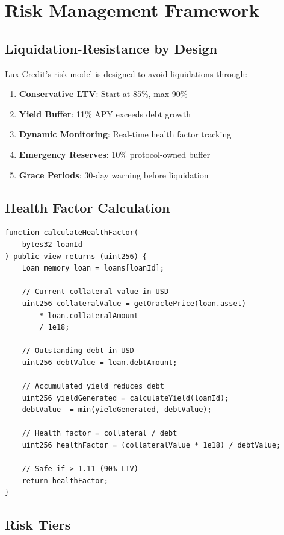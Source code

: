 \section{Risk Management Framework}


\subsection{Liquidation-Resistance by Design}

Lux Credit's risk model is designed to avoid liquidations through:

\begin{enumerate}
\item \textbf{Conservative LTV}: Start at 85\%, max 90\%
\item \textbf{Yield Buffer}: 11\% APY exceeds debt growth
\item \textbf{Dynamic Monitoring}: Real-time health factor tracking
\item \textbf{Emergency Reserves}: 10\% protocol-owned buffer
\item \textbf{Grace Periods}: 30-day warning before liquidation
\end{enumerate}

\subsection{Health Factor Calculation}

\begin{lstlisting}[language=Solidity, basicstyle=\small\ttfamily]
function calculateHealthFactor(
    bytes32 loanId
) public view returns (uint256) {
    Loan memory loan = loans[loanId];
    
    // Current collateral value in USD
    uint256 collateralValue = getOraclePrice(loan.asset) 
        * loan.collateralAmount 
        / 1e18;
    
    // Outstanding debt in USD
    uint256 debtValue = loan.debtAmount;
    
    // Accumulated yield reduces debt
    uint256 yieldGenerated = calculateYield(loanId);
    debtValue -= min(yieldGenerated, debtValue);
    
    // Health factor = collateral / debt
    uint256 healthFactor = (collateralValue * 1e18) / debtValue;
    
    // Safe if > 1.11 (90% LTV)
    return healthFactor;
}
\end{lstlisting}

\subsection{Risk Tiers}

